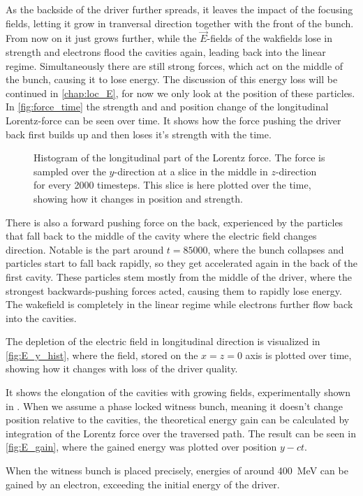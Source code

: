\documentclass[bachelor_thesis]{subfiles}
\begin{document}
As the backside of the driver further spreads, it leaves the impact of the focusing fields, letting it grow in tranversal direction together with the front of the bunch. From now on it just grows further, while the $\vec{E}$-fields of the wakfields lose in strength and electrons flood the cavities again, leading back into the linear regime.
Simultaneously there are still strong forces, which act on the middle of the bunch, causing it to lose energy. The discussion of this energy loss will be continued in \autoref{chap:loc_E}, for now we only look at the position of these particles.
In \autoref{fig:force_time} the strength and and position change of the longitudinal Lorentz-force can be seen over time. It shows how the force pushing the driver back first builds up and then loses it's strength with the time.
\begin{figure}
	\centering
	\missingfigure{}
	\caption{Histogram of the longitudinal part of the Lorentz force. The force is sampled over the $y$-direction at a slice in the middle in $z$-direction for every 2000 timesteps. This slice is here plotted over the time, showing how it changes in position and strength.}
	\label{fig:force_time}
\end{figure}
There is also a forward pushing force on the back, experienced by the particles that fall back to the middle of the cavity where the electric field changes direction. Notable is the part around $t=85000$, where the bunch collapses and particles start to fall back rapidly,
so they get accelerated again in the back of the first cavity. These particles stem mostly from the middle of the driver, where the strongest backwards-pushing forces acted, causing them to rapidly lose energy.
The wakefield is completely in the linear regime while electrons further flow back into the cavities.

The depletion of the electric field in longitudinal direction is visualized in \autoref{fig:E_y_hist}, where the field, stored on the $x=z=0$ axis is plotted over time, showing how it changes with loss of the driver quality.
\begin{figure}
	\centering
	\missingfigure{}
	\caption{}
	\label{fig:E_y_hist}
\end{figure}
It shows the elongation of the cavities with growing fields, experimentally shown in \cite{Schoebel2022}. When we assume a phase locked witness bunch, meaning it doesn't change position relative to the cavities, the theoretical energy gain can be calculated 
by integration of the Lorentz force over the traversed path. The result can be seen in \autoref{fig:E_gain}, where the gained energy was plotted over position $y-ct$.
\begin{figure}
	\centering
	\caption{}
	\label{fig:E_gain}
\end{figure}
When the witness bunch is placed precisely, energies of around \qty{400}{\MeV} can be gained by an electron, exceeding the initial energy of the driver.
\end{document}
